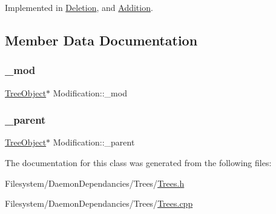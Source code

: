 Implemented in \mbox{\hyperlink{class_deletion_ac5bdb21c4a8dbc8afea9910435e509a8}{Deletion}}, and \mbox{\hyperlink{class_addition_a08cd2dae96a62c80d6fe62339232fbca}{Addition}}.



\subsection{Member Data Documentation}
\mbox{\label{class_modification_a0aa2f9924cde904b1683f3bd80d87a02}} 
\subsubsection{\texorpdfstring{\+\_\+mod}{\_mod}}
{\footnotesize\ttfamily \mbox{\hyperlink{class_tree_object}{Tree\+Object}}$\ast$ Modification\+::\+\_\+mod\hspace{0.3cm}{\ttfamily [protected]}}

\mbox{\label{class_modification_a529d02be9866b96746bcae63a763f868}} 
\subsubsection{\texorpdfstring{\+\_\+parent}{\_parent}}
{\footnotesize\ttfamily \mbox{\hyperlink{class_tree_object}{Tree\+Object}}$\ast$ Modification\+::\+\_\+parent\hspace{0.3cm}{\ttfamily [protected]}}



The documentation for this class was generated from the following files\+:\begin{DoxyCompactItemize}
\item 
Filesystem/\+Daemon\+Dependancies/\+Trees/\mbox{\hyperlink{_trees_8h}{Trees.\+h}}\item 
Filesystem/\+Daemon\+Dependancies/\+Trees/\mbox{\hyperlink{_trees_8cpp}{Trees.\+cpp}}\end{DoxyCompactItemize}
